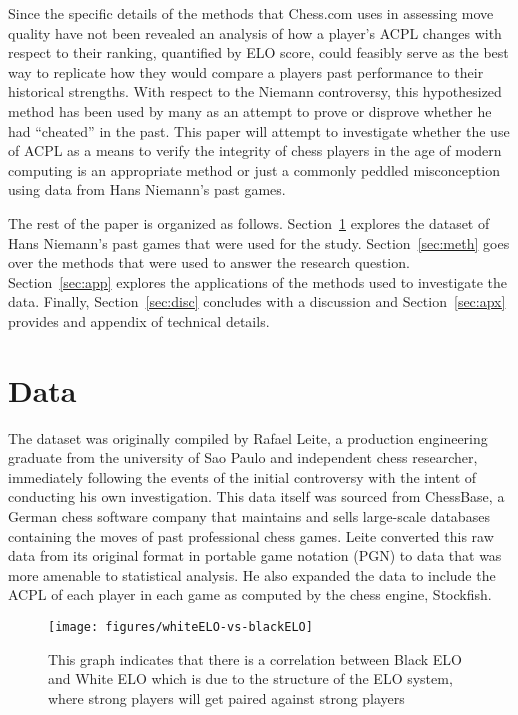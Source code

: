 \documentclass[12pt, letterpaper, titlepage]{article}
\begin{document}
Since the specific details of the methods that Chess.com uses in assessing move quality have not been revealed an analysis of how a player's ACPL changes with respect to their ranking, quantified by ELO score, could feasibly serve as the best way to replicate how they would compare a players past performance to their historical strengths. With respect to the Niemann controversy, this hypothesized method has been used by many\citet{medium2022} as an attempt to prove or disprove whether he had “cheated” in the past. This paper will attempt to investigate whether the use of ACPL as a means to verify the integrity of chess players in the age of modern computing is an appropriate method or just a commonly peddled misconception using data from Hans Niemann's past games.

The rest of the paper is organized as follows. Section~\ref{sec:data} explores the dataset of Hans Niemann's past games that were used for the study. Section~\ref{sec:meth} goes over the methods that were used to answer the research question. Section~\ref{sec:app} explores the applications of the methods used to investigate the data. Finally, Section~\ref{sec:disc} concludes with a discussion and Section~\ref{sec:apx} provides and appendix of technical details.

\section{Data}
\label{sec:data}

The dataset was originally compiled by Rafael Leite\citep{leite2022}, a production engineering graduate from the university of Sao Paulo and independent chess researcher, immediately following the events of the initial controversy with the intent of conducting his own investigation. This data\citep{chessbase} itself was sourced from ChessBase, a German chess software company that maintains and sells large-scale databases containing the moves of past professional chess games. Leite converted this raw data from its original format in portable game notation (PGN) to data that was more amenable to statistical analysis. He also expanded the data to include the ACPL of each player in each game as computed by the chess engine, Stockfish.

\begin{figure}[!htb]
    \centering
    \texttt{[image: figures/whiteELO-vs-blackELO]}
    \caption{This graph indicates that there is a correlation between Black ELO and White ELO which is due to the structure of the ELO system, where strong players will get paired against strong players}
    \label{fig:elo_lineplot}
\end{figure}
\end{document}

